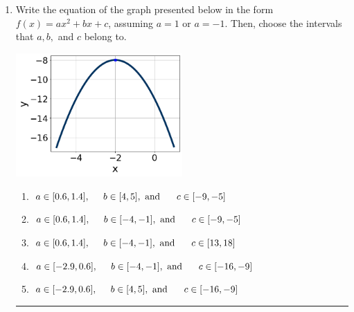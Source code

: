 \documentclass[14pt]{extbook}
\newcommand{\litem}[1]{\item#1\hspace*{-1cm}\rule{\textwidth}{0.4pt}}
\begin{document}
\begin{enumerate}
\litem{
Write the equation of the graph presented below in the form $f(x)=ax^2+bx+c$, assuming  $a=1$ or $a=-1$. Then, choose the intervals that $a, b,$ and $c$ belong to.
\begin{center}
    \includegraphics[width=0.5\textwidth]{../Figures/quadraticGraphToEquationCopyB.png}
\end{center}
\begin{enumerate}[label=\Alph*.]
\item \( a \in [0.6, 1.4], \hspace*{5mm} b \in [4, 5], \text{ and } \hspace*{5mm} c \in [-9, -5] \)
\item \( a \in [0.6, 1.4], \hspace*{5mm} b \in [-4, -1], \text{ and } \hspace*{5mm} c \in [-9, -5] \)
\item \( a \in [0.6, 1.4], \hspace*{5mm} b \in [-4, -1], \text{ and } \hspace*{5mm} c \in [13, 18] \)
\item \( a \in [-2.9, 0.6], \hspace*{5mm} b \in [-4, -1], \text{ and } \hspace*{5mm} c \in [-16, -9] \)
\item \( a \in [-2.9, 0.6], \hspace*{5mm} b \in [4, 5], \text{ and } \hspace*{5mm} c \in [-16, -9] \)


\end{enumerate}}
\end{enumerate}
\end{document}
